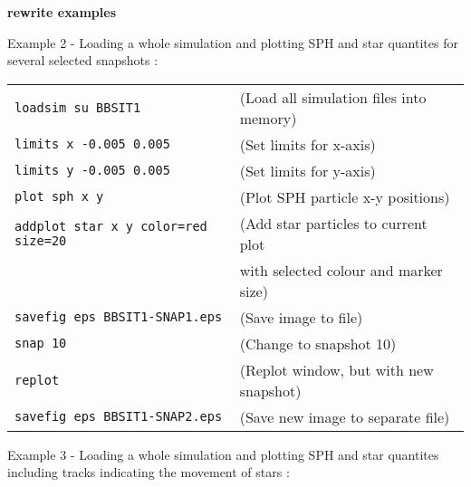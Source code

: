 \documentclass[a4paper]{article}
\newcommand{\var}[1]{\texttt{#1}}
\begin{document}
\textbf{rewrite examples}

%
%


\noindent Example 2 - Loading a whole simulation and plotting SPH and star quantites for several selected snapshots : \\

\begin{tabular}{p{7cm}p{6cm}}
\var{loadsim su BBSIT1} &              (Load all simulation files into memory) \\
\var{limits x -0.005 0.005} &          (Set limits for x-axis) \\
\var{limits y -0.005 0.005} &         (Set limits for y-axis) \\
\var{plot sph x y} &                   (Plot SPH particle x-y positions) \\
\var{addplot star x y color=red size=20} & (Add star particles to current plot \\
                                        & with selected colour and marker size) \\
\var{savefig eps BBSIT1-SNAP1.eps} &   (Save image to file) \\
\var{snap 10}                      &   (Change to snapshot 10) \\
\var{replot}                       &   (Replot window, but with new snapshot)\\
\var{savefig eps BBSIT1-SNAP2.eps} &   (Save new image to separate file)
\end{tabular}
\newline


\noindent Example 3 - Loading a whole simulation and plotting SPH and star quantites including tracks indicating the movement of stars : \\
\end{document}
